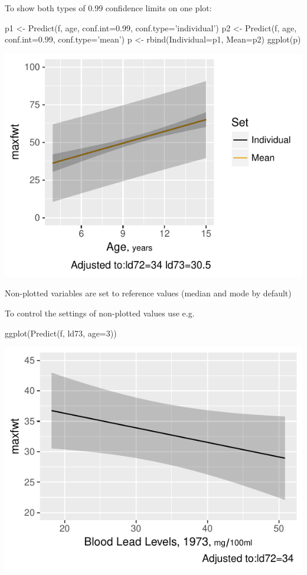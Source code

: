 \item To show both types of 0.99 confidence limits on one plot: \ipacue
\begin{Schunk}
\begin{Sinput}
p1 <- Predict(f, age, conf.int=0.99, conf.type='individual')
p2 <- Predict(f, age, conf.int=0.99, conf.type='mean')
p <- rbind(Individual=p1, Mean=p2)
ggplot(p)
\end{Sinput}


\centerline{\includegraphics{rmsintro-unnamed-chunk-13-1} }

\end{Schunk}
\item Non-plotted variables are set to reference values (median and
  mode by default)
\item To control the settings of non-plotted values use e.g. \ipacue
\begin{Schunk}
\begin{Sinput}
ggplot(Predict(f, ld73, age=3))
\end{Sinput}


\centerline{\includegraphics{rmsintro-unnamed-chunk-14-1} }

\end{Schunk}
